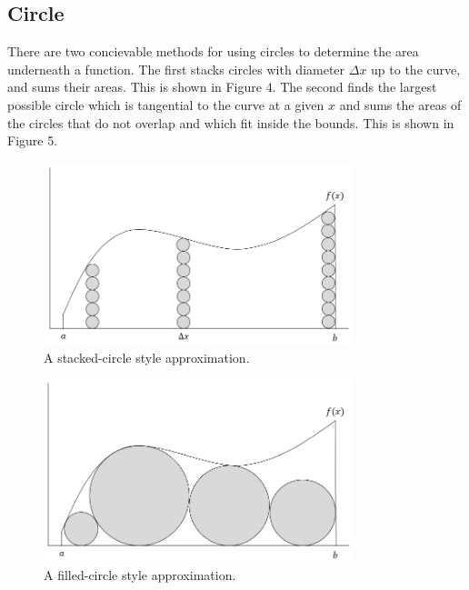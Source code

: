 \documentclass{article}
\begin{document}
    \subsection{Circle}
      There are two concievable methods for using circles to determine the area underneath a function. The first stacks circles with diameter \( \Delta x \) up to the curve, and sums their areas. This is shown in Figure 4. The second finds the largest possible circle which is tangential to the curve at a given \( x \) and sums the areas of the circles that do not overlap and which fit inside the bounds. This is shown in Figure 5.

      \begin{figure}[h]
        \centering
        \includegraphics[width=0.8\textwidth]{circle_example_1}
        \caption{A stacked-circle style approximation.}
      \end{figure}

      \begin{figure}[h]
        \centering
        \includegraphics[width=0.8\textwidth]{circle_example_2}
        \caption{A filled-circle style approximation.}
      \end{figure}
\end{document}
